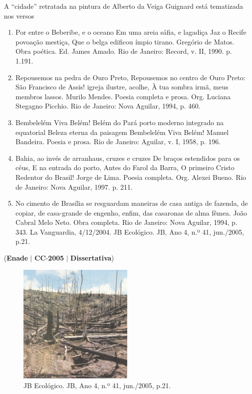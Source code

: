 \documentclass{exam}
\begin{document}
\begin{questions}
A “cidade” retratada na pintura de Alberto da Veiga Guignard está
tematizada nos versos
	\begin{enumerate}[label=\alph*)]
		\item  Por entre o Beberibe, e o oceano
Em uma areia sáfia, e lagadiça
Jaz o Recife povoação mestiça,
Que o belga edificou ímpio tirano.
Gregório de Matos. Obra poética. Ed. James
Amado. Rio de Janeiro: Record, v. II, 1990. p. 1.191.
		\item  Repousemos na pedra de Ouro Preto,
Repousemos no centro de Ouro Preto:
São Francisco de Assis! igreja ilustre, acolhe,
À tua sombra irmã, meus membros lassos.
Murilo Mendes. Poesia completa e prosa. Org. Luciana
Stegagno Picchio. Rio de Janeiro: Nova Aguilar, 1994, p. 460.
		\item  Bembelelém
Viva Belém!
Belém do Pará porto moderno integrado na equatorial
Beleza eterna da paisagem
Bembelelém
Viva Belém!
Manuel Bandeira. Poesia e prosa. Rio
de Janeiro: Aguilar, v. I, 1958, p. 196.
		\item  Bahia, ao invés de arranhaus, cruzes e cruzes
De braços estendidos para os céus,
E na entrada do porto,
Antes do Farol da Barra,
O primeiro Cristo Redentor do Brasil!
Jorge de Lima. Poesia completa. Org. Alexei
Bueno. Rio de Janeiro: Nova Aguilar, 1997. p. 211.
		\item  No cimento de Brasília se resguardam
maneiras de casa antiga de fazenda,
de copiar, de casa-grande de engenho,
enfim, das casaronas de alma fêmea.
João Cabral Melo Neto. Obra completa. Rio
de Janeiro: Nova Aguilar, 1994, p. 343.
La Vanguardia, 4/12/2004.
JB Ecológico. JB, Ano 4, n.º 41, jun./2005, p.21.
	\end{enumerate}

\question (\textbf{Enade} $|$ \textbf{CC}-\textbf{2005} $|$ \textbf{Dissertativa})

\begin{figure}[H]
	\begin{center}
		\includegraphics[width=0.5\textwidth]{CIENCIA_DA_COMPUTACAO_Prova2005-utf8_figuras/fig-0006.jpg}
		\caption{JB Ecológico. JB, Ano 4, n.º 41, jun./2005, p.21.}
	\end{center}
\end{figure}


\end{questions}
\end{document}
